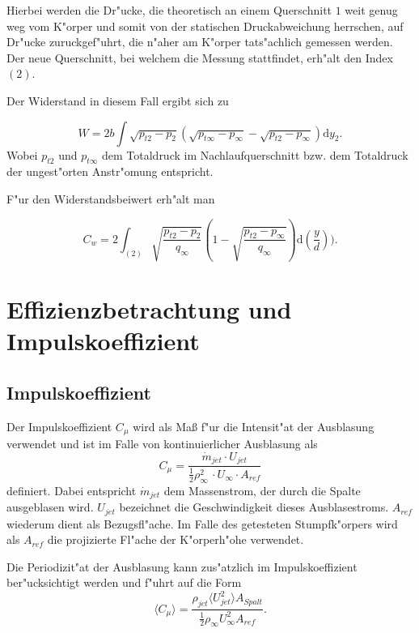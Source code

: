 Hierbei werden die Dr"ucke, die theoretisch an einem Querschnitt $1$ weit genug weg vom K"orper und somit von der statischen Druckabweichung herrschen, auf Dr"ucke zuruckgef"uhrt, die n"aher am K"orper tats"achlich gemessen werden.
Der neue Querschnitt, bei welchem die Messung stattfindet, erh"alt den Index $(2)$.

Der Widerstand in diesem Fall ergibt sich zu

	\begin{equation}
	\label{eq:widerstand_korrigiert}
		W = 2b \int \sqrt{p_{t2} - p_2} \left(\sqrt{p_{t\infty} - p_{\infty}} - \sqrt{p_{t2} - p_{\infty}}\right) \mathrm{d} y_2 .
	\end{equation}
Wobei $p_{t2}$ und $p_{t\infty}$ dem Totaldruck im Nachlaufquerschnitt bzw. dem Totaldruck der ungest"orten Anstr"omung entspricht.

F"ur den Widerstandsbeiwert erh"alt man

	\begin{equation}
	\label{eq:C_w_korrigiert}
		C_w = 2 \int_{(2)} \sqrt{\frac{p_{t2} - p_2}{q_{\infty}}}
		\left(1 - \sqrt{\frac{p_{t2} - p_{\infty}}{q_{\infty}}}\right)  \mathrm{d}\left(\frac{y}{d}\right)).
	\end{equation}

\section{Effizienzbetrachtung und Impulskoeffizient}

\subsection{Impulskoeffizient}
Der Impulskoeffizient $C_{\mu}$ wird als Ma\ss{} f"ur die Intensit"at der Ausblasung verwendet \cite{Sayed} und ist im Falle von kontinuierlicher Ausblasung als 
	\begin{equation}
	\label{eq: Def-momentum-coeff}
		C_{\mu} = \frac{\dot{m}_{jet} \cdot U_{jet}}{\frac{1}{2}\rho^2_{\infty}\, \cdot U_{\infty} \cdot A_{ref}}
	\end{equation}
definiert.
Dabei entspricht $\dot{m}_{jet}$ dem Massenstrom, der durch die Spalte ausgeblasen wird. $U_{jet}$ bezeichnet die Geschwindigkeit dieses Ausblasestroms.
$A_{ref}$ wiederum dient als Bezugsfl"ache. Im Falle des getesteten Stumpfk"orpers wird als $A_{ref}$ die projizierte Fl"ache der K"orperh"ohe verwendet.\cite{Bilges}

Die Periodizit"at der Ausblasung kann zus"atzlich im Impulskoeffizient ber"ucksichtigt werden und f"uhrt auf die Form \cite{Chabert.2014}
	\begin{equation}
	\label{eq:momentum-coeff-oscill}
	\langle{C_{\mu}}\rangle = \frac{\rho_{jet}\langle{U^2_{jet}}\rangle A_{Spalt}}{\frac{1}{2}\rho_{\infty}U^2_{\infty}A_{ref}}.	
	\end{equation}
	
